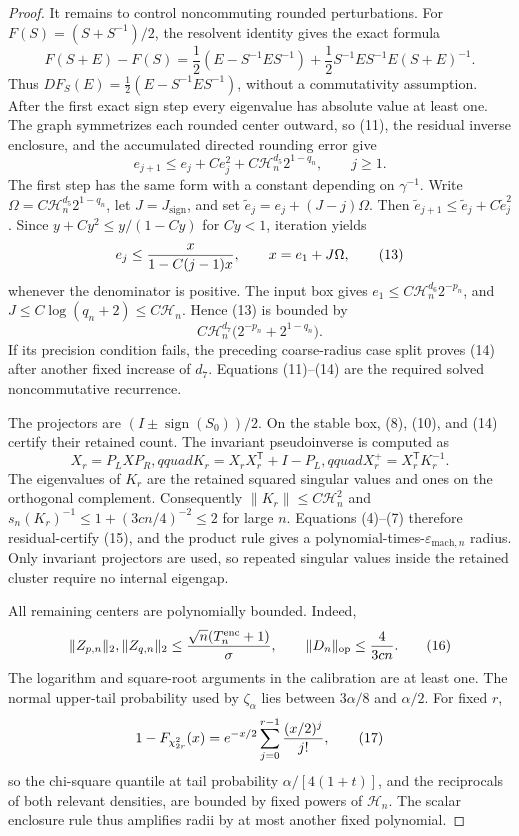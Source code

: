 \documentclass{article}
\begin{document}
\begin{proof}
It remains to control noncommuting rounded perturbations.  For
\(F(S)=(S+S^{-1})/2\), the resolvent identity gives the exact formula
\[
F(S+E)-F(S)
=\frac12(E-S^{-1}ES^{-1})
+\frac12S^{-1}ES^{-1}E(S+E)^{-1}.                                    \tag{11}
\]
Thus \(DF_S(E)=\frac12(E-S^{-1}ES^{-1})\), without a commutativity
assumption.  After the first exact sign step every eigenvalue has absolute value
at least one.  The graph symmetrizes each rounded center outward, so (11), the
residual inverse enclosure, and the accumulated directed rounding error give
\[
e_{j+1}\le e_j+C e_j^2+C\mathcal H_n^{d_5}2^{1-q_n},\qquad j\ge1.    \tag{12}
\]
The first step has the same form with a constant depending on \(\gamma^{-1}\).
Write \(\Omega=C\mathcal H_n^{d_5}2^{1-q_n}\), let
\(J=J_{
\mathrm{sign}}\), and set
\(\widetilde e_j=e_j+(J-j)\Omega\).  Then
\(\widetilde e_{j+1}\le\widetilde e_j+C\widetilde e_j^2\).  Since
\(y+Cy^2\le y/(1-Cy)\) for \(Cy<1\), iteration yields
\[
e_j\le {x\over1-C(j-1)x},
\qquad x=e_1+J\Omega,                                                  \tag{13}
\]
whenever the denominator is positive.  The input box gives
\(e_1\le C\mathcal H_n^{d_6}2^{-p_n}\), and
\(J\le C\log(q_n+2)\le C\mathcal H_n\).  Hence (13) is bounded by
\[
C\mathcal H_n^{d_7}
\bigl(2^{-p_n}+2^{1-q_n}\bigr).                                      \tag{14}
\]
If its precision condition fails, the preceding coarse-radius case split proves
(14) after another fixed increase of \(d_7\).  Equations (11)--(14) are the
required solved noncommutative recurrence.

The projectors are \((I\pm\operatorname{sign}(S_0))/2\).  On the stable box,
(8), (10), and (14) certify their retained count.  The invariant pseudoinverse
is computed as
\[
X_r=P_LXP_R,qquad K_r=X_rX_r^{\mathsf T}+I-P_L,qquad
X_r^+=X_r^{\mathsf T}K_r^{-1}.                                       \tag{15}
\]
The eigenvalues of \(K_r\) are the retained squared singular values and ones on
the orthogonal complement.  Consequently
\(\|K_r\|\le C\mathcal H_n^2\) and
\(s_n(K_r)^{-1}\le1+(3cn/4)^{-2}\le2\) for large \(n\).  Equations
(4)--(7) therefore residual-certify (15), and the product rule gives a
polynomial-times-\(\varepsilon_{
\mathrm{mach},n}\) radius.  Only invariant projectors are used, so repeated
singular values inside the retained cluster require no internal eigengap.

All remaining centers are polynomially bounded.  Indeed,
\[
\|Z_{p,n}\|_2,\|Z_{q,n}\|_2
\le {\sqrt n(T_n^{\mathrm{enc}}+1)\over\sigma},
\qquad \|D_n\|_{
\mathrm{op}}\le {4\over3cn}.                                        \tag{16}
\]
The logarithm and square-root arguments in the calibration are at least one.
The normal upper-tail probability used by \(\zeta_\alpha\) lies between
\(3\alpha/8\) and \(\alpha/2\).  For fixed \(r\),
\[
1-F_{\chi^2_{2r}}(x)
=e^{-x/2}\sum_{j=0}^{r-1}{(x/2)^j\over j!},                           \tag{17}
\]
so the chi-square quantile at tail probability
\(\alpha/[4(1+t)]\), and the reciprocals of both relevant densities, are
bounded by fixed powers of \(\mathcal H_n\).  The scalar enclosure rule thus
amplifies radii by at most another fixed polynomial.


\end{proof}
\end{document}

